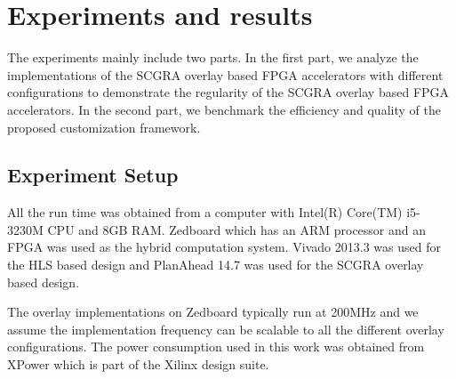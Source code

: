 \section{Experiments and results} \label{sec:result}
The experiments mainly include two parts. In the first part, we 
analyze the implementations of the SCGRA overlay based FPGA accelerators with 
different configurations to demonstrate the regularity of the 
SCGRA overlay based FPGA accelerators. In the second part, we benchmark the 
efficiency and quality of the proposed customization framework.

\subsection{Experiment Setup}
All the run time was obtained from a computer with Intel(R) Core(TM) 
i5-3230M CPU and 8GB RAM. Zedboard which has an ARM processor and 
an FPGA was used as the hybrid computation system. Vivado 2013.3 was 
used for the HLS based design and PlanAhead 14.7 was used for the SCGRA overlay based 
design. 

The overlay implementations on Zedboard typically run at 200MHz and we 
assume the implementation frequency can be scalable to all the 
different overlay configurations. The power consumption used in this work was 
obtained from XPower which is part of the Xilinx design suite.


